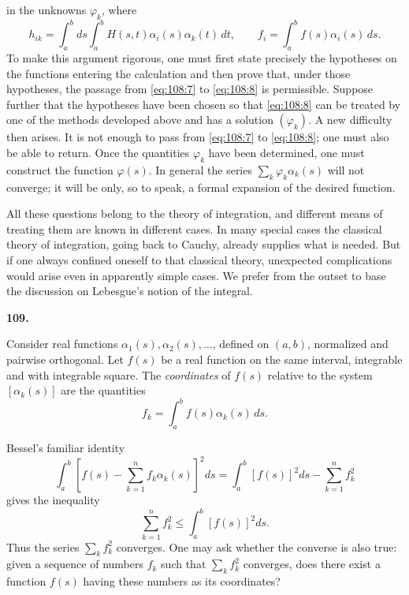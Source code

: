 \documentclass[
  paper=b5,
  fontsize=13pt,
  twoside=true,
  open=any,
  bookmarkpackage=false,
  chapterprefix=true,
  headings=normal
]{scrbook}
\theoremstyle{definition}
\newcommand{\numberedparagraph}[1]{%
  \par\medskip\phantomsection\label{sec:#1}%
  \noindent\textbf{#1.}\enspace
}
\begin{document}
\pagebreak[2]
in the unknowns \(\varphi_k\), where
\[
  h_{ik}=\int_a^b\!ds\int_a^b H(s,t)\alpha_i(s)\alpha_k(t)\,dt,
  \qquad
  f_i=\int_a^b f(s)\alpha_i(s)\,ds.
\]
To make this argument rigorous, one must first state precisely the hypotheses
on the functions entering the calculation and then prove that, under those
hypotheses, the passage from \eqref{eq:108:7} to \eqref{eq:108:8} is
permissible.  Suppose further that the hypotheses have been chosen so that
\eqref{eq:108:8} can be treated by one of the methods developed above and has
a solution \((\varphi_k)\).  A new difficulty then arises.  It is not enough
to pass from \eqref{eq:108:7} to \eqref{eq:108:8}; one must also be able to
return.  Once the quantities \(\varphi_k\) have been determined, one must
construct the function \(\varphi(s)\).  In general the series
\(\sum_k\varphi_k\alpha_k(s)\) will not converge; it will be only, so to speak,
a formal expansion of the desired function.

All these questions belong to the theory of integration, and different means
of treating them are known in different cases.  In many special cases the
classical theory of integration, going back to Cauchy, already supplies what
is needed.  But if one always confined oneself to that classical theory,
unexpected complications would arise even in apparently simple cases.  We
prefer from the outset to base the discussion on Lebesgue's notion of the
integral.

\numberedparagraph{109}
Consider real functions \(\alpha_1(s),\alpha_2(s),\ldots\), defined on
\((a,b)\), normalized and pairwise orthogonal.  Let \(f(s)\) be a real
function on the same interval, integrable and with integrable square.  The
\emph{coordinates} of \(f(s)\) relative to the system \([\alpha_k(s)]\) are
the quantities
\[
  f_k=\int_a^b f(s)\alpha_k(s)\,ds.
\]

Bessel's familiar identity
\[
  \int_a^b\left[f(s)-\sum_{k=1}^{n}f_k\alpha_k(s)\right]^2ds
  =\int_a^b[f(s)]^2ds-\sum_{k=1}^{n}f_k^2
\]
gives the inequality
\[
  \sum_{k=1}^{n}f_k^2\le\int_a^b[f(s)]^2ds.
\]
Thus the series \(\sum_kf_k^2\) converges.  One may ask whether the converse
is also true: given a sequence of numbers \(f_k\) such that
\(\sum_kf_k^2\) converges, does there exist a function \(f(s)\) having these
numbers as its coordinates?
\end{document}
